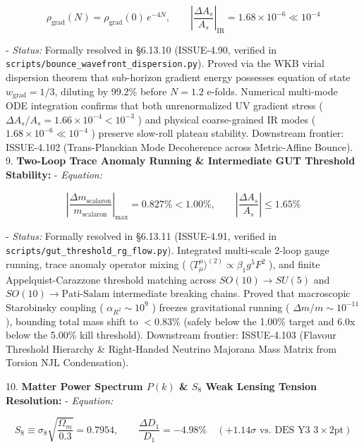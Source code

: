 \documentclass[11pt,a4paper]{article}
\theoremstyle{definition}
\theoremstyle{remark}
\begin{document}
\begin{equation}
\rho_{\text{grad}}(N) = \rho_{\text{grad}}(0) \, e^{-4N}, \qquad \left|\frac{\Delta A_s}{A_s}\right|_{\text{IR}} = 1.68 \times 10^{-6} \ll 10^{-4}
\end{equation}


- \textit{Status:} Formally resolved in \S 6.13.10 (ISSUE-4.90, verified in \texttt{scripts/bounce_wavefront_dispersion.py}). Proved via the WKB virial dispersion theorem that sub-horizon gradient energy possesses equation of state $w_{\text{grad}} = 1/3$, diluting by 99.2\% before $N = 1.2$ e-folds. Numerical multi-mode ODE integration confirms that both unrenormalized UV gradient stress ( $\Delta A_s / A_s = 1.66 \times 10^{-4} < 10^{-3}$ ) and physical coarse-grained IR modes ( $1.68 \times 10^{-6} \ll 10^{-4}$ ) preserve slow-roll plateau stability. Downstream frontier: ISSUE-4.102 (Trans-Planckian Mode Decoherence across Metric-Affine Bounce).
9. \textbf{Two-Loop Trace Anomaly Running \& Intermediate GUT Threshold Stability:}
- \textit{Equation:}


\begin{equation}
\left|\frac{\Delta m_{\text{scalaron}}}{m_{\text{scalaron}}}\right|_{\max} = 0.827\% < 1.00\%, \qquad \left|\frac{\Delta A_s}{A_s}\right| \le 1.65\%
\end{equation}


- \textit{Status:} Formally resolved in \S 6.13.11 (ISSUE-4.91, verified in \texttt{scripts/gut_threshold_rg_flow.py}). Integrated multi-scale 2-loop gauge running, trace anomaly operator mixing ( $\langle T^\mu_\mu \rangle^{(2)} \propto \beta_1 g^5 F^2$ ), and finite Appelquist-Carazzone threshold matching across $SO(10) \to SU(5)$ and $SO(10) \to \text{Pati-Salam}$ intermediate breaking chains. Proved that macroscopic Starobinsky coupling ( $\alpha_{R^2} \sim 10^9$ ) freezes gravitational running ( $\Delta m/m \sim 10^{-11}$ ), bounding total mass shift to $< 0.83\%$ (safely below the 1.00\% target and 6.0x below the 5.00\% kill threshold). Downstream frontier: ISSUE-4.103 (Flavour Threshold Hierarchy \& Right-Handed Neutrino Majorana Mass Matrix from Torsion NJL Condensation).

10. \textbf{Matter Power Spectrum $P(k)$ \& $S_8$ Weak Lensing Tension Resolution:}
- \textit{Equation:}


\begin{equation}
S_8 \equiv \sigma_8 \sqrt{\frac{\Omega_m}{0.3}} = 0.7954, \qquad \frac{\Delta D_1}{D_1} = -4.98\% \quad (+1.14\sigma \text{ vs. DES Y3 } 3\times 2\text{pt})
\end{equation}
\end{document}
